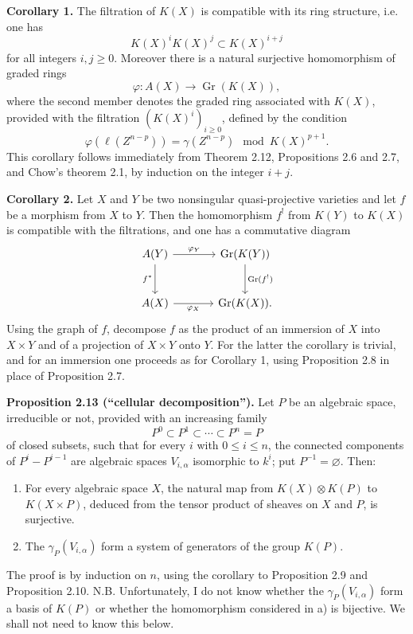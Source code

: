 \documentclass[11pt]{article}
\newcommand{\Gr}{\operatorname{Gr}}
\providecommand{\Gr}{\operatorname{Gr}}
\providecommand{\ellc}{\ell}
\providecommand{\Gr}{\operatorname{G}}
\begin{document}
\textbf{Corollary 1.} The filtration of $K(X)$ is compatible with its ring structure, i.e. one has
\[
 K(X)^iK(X)^j\subset K(X)^{i+j}
\]
for all integers $i,j\geq 0$. Moreover there is a natural surjective homomorphism of graded rings
\begin{equation}\tag{2.34}
 \varphi:A(X)\longrightarrow \Gr(K(X)),
\end{equation}
where the second member denotes the graded ring associated with $K(X)$, provided with the filtration $(K(X)^i)_{i\geq 0}$, defined by the condition
\[
 \varphi(\ellc(Z^{n-p}))=\gamma(Z^{n-p})\mod K(X)^{p+1}.
\]
This corollary follows immediately from Theorem 2.12, Propositions 2.6 and 2.7, and Chow's theorem 2.1, by induction on the integer $i+j$.

\textbf{Corollary 2.} Let $X$ and $Y$ be two nonsingular quasi-projective varieties and let $f$ be a morphism from $X$ to $Y$. Then the homomorphism $f^!$ from $K(Y)$ to $K(X)$ is compatible with the filtrations, and one has a commutative diagram
\[
\begin{tikzcd}[column sep=large,row sep=large]
A(Y) \arrow[r,"\varphi_Y"] \arrow[d,"f^*"'] & \Gr(K(Y)) \arrow[d,"\Gr(f^!)"]\\
A(X) \arrow[r,"\varphi_X"'] & \Gr(K(X)).
\end{tikzcd}
\]
Using the graph of $f$, decompose $f$ as the product of an immersion of $X$ into $X\times Y$ and of a projection of $X\times Y$ onto $Y$. For the latter the corollary is trivial, and for an immersion one proceeds as for Corollary 1, using Proposition 2.8 in place of Proposition 2.7.

\textbf{Proposition 2.13 (``cellular decomposition'').} Let $P$ be an algebraic space, irreducible or not, provided with an increasing family
\[
P^0\subset P^1\subset\cdots\subset P^n=P
\]
of closed subsets, such that for every $i$ with $0\leq i\leq n$, the connected components of $P^i-P^{i-1}$ are algebraic spaces $V_{i,\alpha}$ isomorphic to $k^i$; put $P^{-1}=\varnothing$. Then:
\begin{enumerate}[label=\alph*)]
\item For every algebraic space $X$, the natural map from $K(X)\otimes K(P)$ to $K(X\times P)$, deduced from the tensor product of sheaves on $X$ and $P$, is surjective.
\item The $\gamma_P(V_{i,\alpha})$ form a system of generators of the group $K(P)$.
\end{enumerate}
The proof is by induction on $n$, using the corollary to Proposition 2.9 and Proposition 2.10. N.B. Unfortunately, I do not know whether the $\gamma_P(V_{i,\alpha})$ form a basis of $K(P)$ or whether the homomorphism considered in a) is bijective. We shall not need to know this below.
\end{document}
